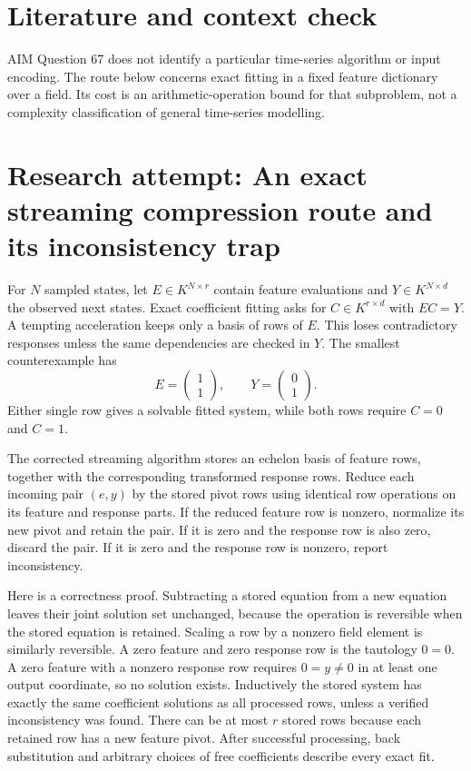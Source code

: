 \documentclass[11pt]{article}
\begin{document}
\section{Literature and context check}
AIM Question 67 does not identify a particular time-series algorithm or input encoding. The route below concerns exact fitting in a fixed feature dictionary over a field. Its cost is an arithmetic-operation bound for that subproblem, not a complexity classification of general time-series modelling.
\section{Research attempt: An exact streaming compression route and its inconsistency trap}
For $N$ sampled states, let $E\in K^{N\times r}$ contain feature evaluations and $Y\in K^{N\times d}$ the observed next states. Exact coefficient fitting asks for $C\in K^{r\times d}$ with $EC=Y$. A tempting acceleration keeps only a basis of rows of $E$. This loses contradictory responses unless the same dependencies are checked in $Y$. The smallest counterexample has
\[
E=\begin{pmatrix}1\\1\end{pmatrix},\qquad
Y=\begin{pmatrix}0\\1\end{pmatrix}.
\]
Either single row gives a solvable fitted system, while both rows require $C=0$ and $C=1$.

The corrected streaming algorithm stores an echelon basis of feature rows, together with the corresponding transformed response rows. Reduce each incoming pair $(e,y)$ by the stored pivot rows using identical row operations on its feature and response parts. If the reduced feature row is nonzero, normalize its new pivot and retain the pair. If it is zero and the response row is also zero, discard the pair. If it is zero and the response row is nonzero, report inconsistency.

Here is a correctness proof. Subtracting a stored equation from a new equation leaves their joint solution set unchanged, because the operation is reversible when the stored equation is retained. Scaling a row by a nonzero field element is similarly reversible. A zero feature and zero response row is the tautology $0=0$. A zero feature with a nonzero response row requires $0=y\ne0$ in at least one output coordinate, so no solution exists. Inductively the stored system has exactly the same coefficient solutions as all processed rows, unless a verified inconsistency was found. There can be at most $r$ stored rows because each retained row has a new feature pivot. After successful processing, back substitution and arbitrary choices of free coefficients describe every exact fit.
\end{document}
